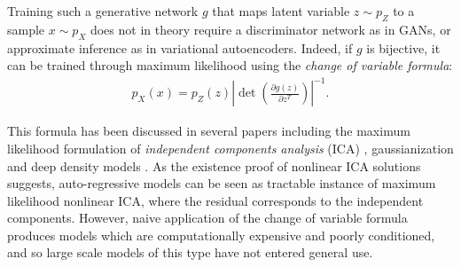 \documentclass{article}
\newcommand{\jcom}[1]{\textcolor{darkgreen}{[jascha: #1]}}
\begin{document}
Training such a generative network $g$ that maps latent variable $z \sim p_{Z}$ to a sample $x \sim p_{X}$ does not in theory require a discriminator network as in GANs, or approximate inference as in variational autoencoders. Indeed, if $g$ is bijective, it can be trained through maximum likelihood using the \emph{change of variable formula}:
\begin{align}
p_{X}(x) = p_{Z}(z) \left\vert \det\left(\frac{\partial g(z)}{\partial z^T}\right)\right\vert^{-1}
.
\end{align}

This formula has been discussed in several papers including the maximum likelihood formulation of \emph{independent components analysis} (ICA) \citep{bell1995information, hyvarinen2004independent}, gaussianization \citep{NIPS1994_901, chen2000gaussianization} and deep density models \citep{bengio1991artificial, rippel2013high, dinh2014nice, balle2015density}.
As the existence proof of nonlinear ICA solutions \citep{hyvarinen1999nonlinear} suggests, auto-regressive models can be seen as tractable instance of maximum likelihood nonlinear ICA, where the residual corresponds to the independent components.
However, naive application of the change of variable formula produces models which are computationally expensive and poorly conditioned, and so large scale models of this type have not entered general use.
\end{document}

